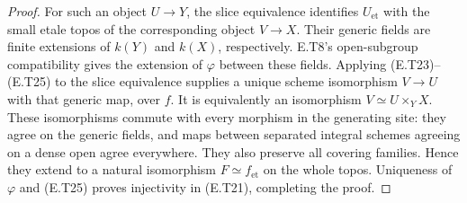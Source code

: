 \begin{proof}
For such an object $U\to Y$, the slice equivalence identifies
$U_{\mathrm{et}}$ with the small etale topos of the
corresponding object $V\to X$.  Their generic fields are
finite extensions of $k(Y)$ and $k(X)$, respectively.
E.T8's open-subgroup compatibility gives the extension of
$\varphi$ between these fields.  Applying (E.T23)--(E.T25)
to the slice equivalence supplies a unique scheme
isomorphism $V\to U$ with that generic map, over $f$.
It is equivalently an isomorphism $V\simeq U\times_YX$.
These isomorphisms commute with every morphism in the
generating site: they agree on the generic fields, and
maps between separated integral schemes agreeing on a
dense open agree everywhere.  They also preserve all
covering families.  Hence they extend to a natural
isomorphism $F\simeq f_{\mathrm{et}}$ on the whole topos.
Uniqueness of $\varphi$ and (E.T25) proves injectivity in
(E.T21), completing the proof.
\end{proof}

